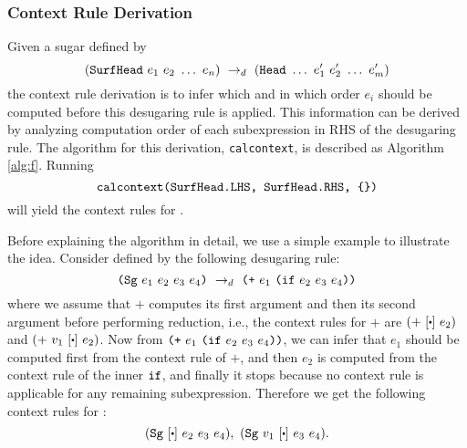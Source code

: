 \subsubsection{Context Rule Derivation}
Given a sugar  defined by
\[
(\mbox{\tt SurfHead}~e_1~e_2~\ldots~e_n) ~\rightarrow_d~ (\mbox{\tt Head}~\ldots~e_1'~e_2'~\ldots~e_m')
\]
the context rule derivation is to infer which and in which order $e_i$ should be computed before this desugaring rule is applied. This information can be derived by analyzing computation order of each subexpression in RHS of the desugaring rule.
The algorithm for this derivation, \texttt{calcontext}, is described as Algorithm \ref{alg:f}. Running
\[
 \texttt{calcontext(\mbox{\tt SurfHead}.LHS,~\mbox{\tt SurfHead}.RHS, \{\})}
\]
will yield the context rules for .

Before explaining the algorithm in detail, we use a simple example to illustrate the idea.
Consider  defined by the following desugaring rule:
\[
\mbox{\tt (Sg}~e_1~e_2~e_3~e_4\mbox{\tt )} ~\rightarrow_d~ \mbox{\tt (+}~e_1~\mbox{\tt (if}~e_2~e_3~e_4\mbox{\tt ))}
\]
where we assume that $+$ computes its first argument and then its second argument before performing reduction, i.e., the context rules for $+$ are  $(+~[\bigcdot]~e_2)$ and $(+~v_1~[\bigcdot]~e_2)$. Now from $\mbox{\tt (+}~e_1~\mbox{\tt (if}~e_2~e_3~e_4\mbox{\tt ))}$, we can infer that $e_1$ should be computed first from the context rule of $+$, and then $e_2$ is computed from the context rule of the inner $\mbox{\tt if}$, and finally it stops because no context rule is applicable for any remaining subexpression. Therefore we get the following context rules for :
\[
(\m{Sg}~[\bigcdot]~e_2~e_3~e_4),~(\m{Sg}~v_1~[\bigcdot]~e_3~e_4).
\]

